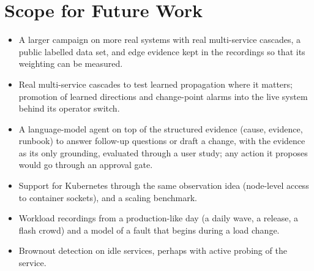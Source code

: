 \section{Scope for Future Work}
\begin{itemize}
\item A larger campaign on more real systems with real multi-service cascades, a public labelled data set, and edge evidence kept in the recordings so that its weighting can be measured.
\item Real multi-service cascades to test learned propagation where it matters; promotion of learned directions and change-point alarms into the live system behind its operator switch.
\item A language-model agent on top of the structured evidence (cause, evidence, runbook) to answer follow-up questions or draft a change, with the evidence as its only grounding, evaluated through a user study; any action it proposes would go through an approval gate.
\item Support for Kubernetes through the same observation idea (node-level access to container sockets), and a scaling benchmark.
\item Workload recordings from a production-like day (a daily wave, a release, a flash crowd) and a model of a fault that begins during a load change.
\item Brownout detection on idle services, perhaps with active probing of the service.
\end{itemize}
